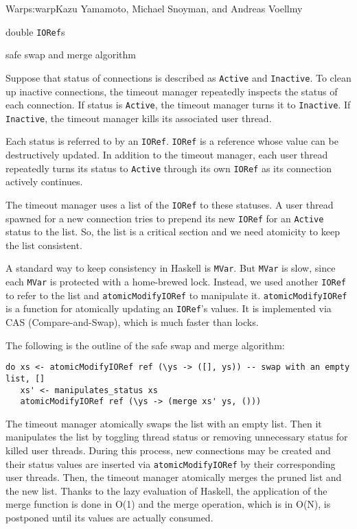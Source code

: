 \begin{aosachapter}{Warp}{s:warp}{Kazu Yamamoto, Michael Snoyman, and Andreas Voellmy}
\begin{aosaitemize}

\item
  double \texttt{IORef}s
\item
  safe swap and merge algorithm
\end{aosaitemize}

Suppose that status of connections is described as \texttt{Active} and
\texttt{Inactive}. To clean up inactive connections, the timeout manager
repeatedly inspects the status of each connection. If status is
\texttt{Active}, the timeout manager turns it to \texttt{Inactive}. If
\texttt{Inactive}, the timeout manager kills its associated user thread.

Each status is referred to by an \texttt{IORef}. \texttt{IORef} is a
reference whose value can be destructively updated. In addition to the
timeout manager, each user thread repeatedly turns its status to
\texttt{Active} through its own \texttt{IORef} as its connection
actively continues.

The timeout manager uses a list of the \texttt{IORef} to these statuses.
A user thread spawned for a new connection tries to prepend its new
\texttt{IORef} for an \texttt{Active} status to the list. So, the list
is a critical section and we need atomicity to keep the list consistent.


A standard way to keep consistency in Haskell is \texttt{MVar}. But
\texttt{MVar} is slow, since each \texttt{MVar} is protected with a
home-brewed lock. Instead, we used another \texttt{IORef} to refer to
the list and \texttt{atomicModifyIORef} to manipulate it.
\texttt{atomicModifyIORef} is a function for atomically updating an
\texttt{IORef}'s values. It is implemented via CAS (Compare-and-Swap),
which is much faster than locks.

\newpage

The following is the outline of the safe swap and merge algorithm:

\begin{verbatim}
do xs <- atomicModifyIORef ref (\ys -> ([], ys)) -- swap with an empty list, []
   xs' <- manipulates_status xs
   atomicModifyIORef ref (\ys -> (merge xs' ys, ()))
\end{verbatim}

\noindent The timeout manager atomically swaps the list with an empty list. Then
it manipulates the list by toggling thread status or removing
unnecessary status for killed user threads. During this process, new
connections may be created and their status values are inserted via
\texttt{atomicModifyIORef} by their corresponding user threads. Then,
the timeout manager atomically merges the pruned list and the new list.
Thanks to the lazy evaluation of Haskell, the application of the merge
function is done in O(1) and the merge operation, which is in O(N), is
postponed until its values are actually consumed.


\end{aosachapter}
